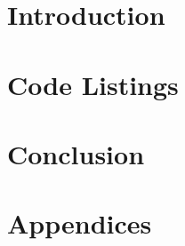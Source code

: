 

\newcommand{\courseName}{Machine Learning \& Vision Systems}
\newcommand{\courseCode}{MFET 4015}
\newcommand{\dueDate}{12/04/22}
\newcommand{\supervisors}{Professor Lee Sang-Heon\\ Md Ahasan Kabir}
\newcommand{\submissionType}{Group Project}
\newcommand{\submissionTitle}{Image Processing using MATLAB}
\newcommand{\headerTitle}{\submissionTitle}


\FloatBarrier
{} %


\section{Introduction}
\FloatBarrier




\clearpage\section{Code Listings}
\FloatBarrier

\clearpage\section{Conclusion}
\FloatBarrier

\clearpage
% 



\clearpage\section{Appendices}


